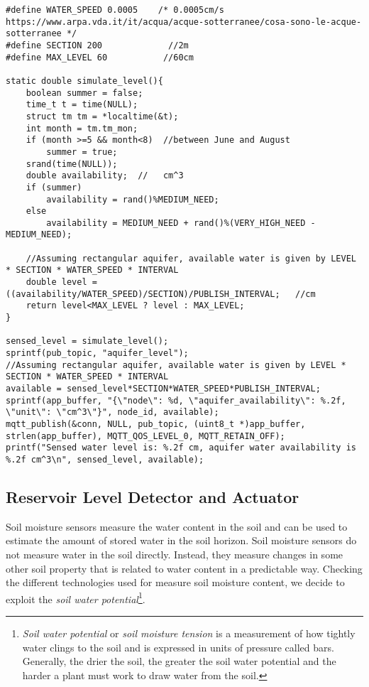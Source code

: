 \begin{lstlisting}
#define WATER_SPEED 0.0005    /* 0.0005cm/s   https://www.arpa.vda.it/it/acqua/acque-sotterranee/cosa-sono-le-acque-sotterranee */
#define SECTION 200             //2m
#define MAX_LEVEL 60           //60cm

static double simulate_level(){
    boolean summer = false;
    time_t t = time(NULL);
    struct tm tm = *localtime(&t);
    int month = tm.tm_mon;
    if (month >=5 && month<8)  //between June and August
        summer = true;
    srand(time(NULL));
    double availability;  //   cm^3
    if (summer)
        availability = rand()%MEDIUM_NEED;
    else
        availability = MEDIUM_NEED + rand()%(VERY_HIGH_NEED - MEDIUM_NEED);

    //Assuming rectangular aquifer, available water is given by LEVEL * SECTION * WATER_SPEED * INTERVAL
    double level = ((availability/WATER_SPEED)/SECTION)/PUBLISH_INTERVAL;   //cm
    return level<MAX_LEVEL ? level : MAX_LEVEL;
}    
    
sensed_level = simulate_level();
sprintf(pub_topic, "aquifer_level");
//Assuming rectangular aquifer, available water is given by LEVEL * SECTION * WATER_SPEED * INTERVAL
available = sensed_level*SECTION*WATER_SPEED*PUBLISH_INTERVAL;
sprintf(app_buffer, "{\"node\": %d, \"aquifer_availability\": %.2f, \"unit\": \"cm^3\"}", node_id, available);
mqtt_publish(&conn, NULL, pub_topic, (uint8_t *)app_buffer, strlen(app_buffer), MQTT_QOS_LEVEL_0, MQTT_RETAIN_OFF);
printf("Sensed water level is: %.2f cm, aquifer water availability is %.2f cm^3\n", sensed_level, available);
\end{lstlisting}



\subsection{Reservoir Level Detector and Actuator}
Soil moisture sensors measure the water content in the soil and can be used to estimate the amount of stored water in the soil horizon. Soil moisture sensors do not measure water in the soil directly. Instead, they measure changes in some other soil property that is related to water content in a predictable way. Checking the different technologies used for measure soil moisture content, we decide to exploit the \textit{soil water potential}\footnote{\textit{Soil water potential} or \textit{soil moisture tension} is a measurement of how tightly water clings to the soil and is expressed in units of pressure called bars. Generally, the drier the soil, the greater the soil water potential and the harder a plant must work to draw water from the soil.}.

